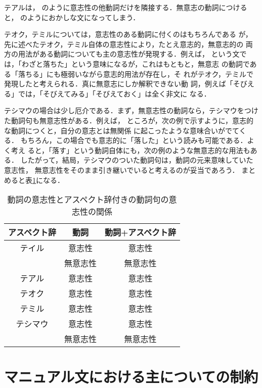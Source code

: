 {テアルは，
のように意志性の他動詞だけを隣接する．無意志の動詞につけると，
のようにおかしな文になってしまう．

テオク，テミルについては，意志性のある動詞に付くのはもちろんである
が，先に述べたテオク，テミル自体の意志性により，たとえ意志的，無意志的の
両方の用法がある動詞についても{\dg 主}の意志性が発現する．例えば，
という文では，「わざと落ちた」という意味になるが，これはもともと，無意志
の動詞である「落ちる」にも極弱いながら意志的用法が存在し\cite{IPAL}，そ
れがテオク，テミルで発現したと考えられる．真に無意志にしか解釈できない動
詞，例えば「そびえる」では，「そびえてみる」「そびえておく」は全く非文に
なる．

テシマウの場合は少し厄介である．まず，無意志性の動詞なら，テシマウをつけ
た動詞句も無意志性がある．例えば，
ところが，次の例で示すように，意志的な動詞につくと，自分の意志とは無関係
に起こったような意味合いがでてくる．
もちろん，この場合でも意志的に「落した」という読みも可能である．よく考え
ると，「落す」という動詞自体にも，次の例のような無意志的な用法もある．
したがって，結局，テシマウのついた動詞句は，動詞の元来意味していた意志性，
無意志性をそのまま引き継いでいると考えるのが妥当であろう．
まとめると表\ref{table0}になる．

\begin{table}
\caption{動詞の意志性とアスペクト辞付きの動詞句の意志性の関係}
\begin{center}
\begin{tabular}{|c||c|c|}
\hline アスペクト辞 & 動詞 & 動詞+アスペクト辞 \\\hline\hline
テイル & 意志性 &  意志性 \\& 無意志性 & 無意志性 \\\hline
テアル & 意志性 & 意志性 \\\hline
テオク & 意志性 & 意志性 \\\hline
テミル & 意志性 & 意志性 \\\hline
テシマウ & 意志性 &  意志性 \\& 無意志性 & 無意志性 \\\hline
\end{tabular}
\end{center}
\label{table0}
\end{table}

\section{マニュアル文における{\dg 主}についての制約}
\label{manual}

}
